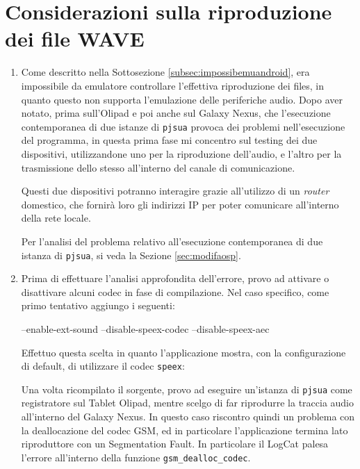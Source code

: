 \section{Considerazioni sulla riproduzione dei file WAVE}\label{sec:consWAVE}
\begin{enumerate}
\item Come descritto nella Sottosezione \vref{subsec:impossibemuandroid}, era
	impossibile da emulatore controllare l'effettiva riproduzione dei files,
	in quanto questo non supporta l'emulazione delle periferiche audio.
	Dopo aver notato, prima sull'Olipad e poi anche sul Galaxy Nexus, che
	l'esecuzione contemporanea di due istanze di \texttt{\small pjsua} 
	provoca dei problemi nell'esecuzione del programma, in questa prima
	fase mi concentro sul testing dei due dispositivi, utilizzandone uno
	per la riproduzione dell'audio, e l'altro per la trasmissione dello stesso
	all'interno del canale di comunicazione. 
	
	Questi due dispositivi potranno interagire grazie all'utilizzo di un 
	\textit{router} domestico, che fornirà loro gli indirizzi IP per poter 
	comunicare all'interno della rete locale.
	
	Per l'analisi del problema relativo all'esecuzione contemporanea di 
	due istanza di \texttt{\small pjsua}, si veda la Sezione \vref{sec:modifaosp}.
	
\item Prima di effettuare l'analisi approfondita dell'errore, provo ad attivare
	o disattivare alcuni codec in fase di compilazione. Nel caso specifico,
	come primo tentativo aggiungo i seguenti:
	\begin{bash}
--enable-ext-sound --disable-speex-codec --disable-speex-aec 
	\end{bash}
	Effettuo questa scelta in quanto l'applicazione mostra, con la configurazione
	di default, di utilizzare il codec \texttt{\small speex}:
	Una volta ricompilato il sorgente, provo ad eseguire un'istanza
	di \texttt{\small pjsua} come registratore sul Tablet Olipad, mentre 
	scelgo di far riprodurre la traccia audio all'interno del Galaxy Nexus.
	In questo caso riscontro quindi un problema con la deallocazione del
	codec GSM, ed in particolare l'applicazione termina lato riproduttore
	con un Segmentation Fault. In particolare il LogCat palesa l'errore
	all'interno della funzione  \texttt{\small gsm\_dealloc\_codec}.
	

\end{enumerate}
